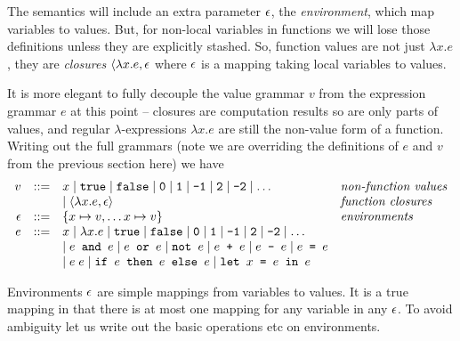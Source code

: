 The semantics will include an extra parameter $\epsilon$, the \emph{environment}, which map variables to values.  But, for non-local variables in functions we will lose those definitions unless they are explicitly stashed.  So, function values are not just $\lambda x.e$, they are \emph{closures} $\langle \lambda x.e, \epsilon$ where $\epsilon$ is a mapping taking local variables to values.

It is more elegant to fully decouple the value grammar $v$ from the expression grammar $e$ at this point -- closures are computation results so are only parts of values, and regular $\lambda$-expressions $\lambda x.e$ are still the non-value form of a function.  Writing out the full grammars (note we are overriding the definitions of $e$ and $v$ from the previous section here) we have
$$
\begin{array}{rcll}
v &::=& x \mid \texttt{true} \mid \texttt{false} \mid \texttt{0}\mid \texttt{1}\mid \texttt{-1}\mid \texttt{2}\mid  \texttt{-2}\mid \ldots & \textit{non-function values}\\
  &   & \mid \langle \lambda x. e, \epsilon \rangle  & \textit{function closures}\\
\epsilon &::=& \{x \mapsto v, \dots x \mapsto v \}&\textit{environments}\\
e &::=& x \mid \lambda x. e \mid \texttt{true} \mid \texttt{false} \mid \texttt{0}\mid \texttt{1}\mid \texttt{-1}\mid \texttt{2}\mid  \texttt{-2}\mid \ldots\\
  &   & \mid e \texttt{ and } e \mid e \texttt{ or } e \mid \texttt{not }
        e \mid e \texttt{ + }e \mid e \texttt{ - }e \mid e \texttt{ = }e \\
& & \mid e\;e
\mid \texttt{if }e\texttt{ then }e\texttt{ else }e
\mid \texttt{let } x \texttt{ = }e\texttt{ in }e
\end{array}
$$
 
Environments $\epsilon$ are simple mappings from variables to values.  It is a true mapping in that there is at most one mapping for any variable in any $\epsilon$.   To avoid ambiguity let us write out the basic operations etc on environments.

